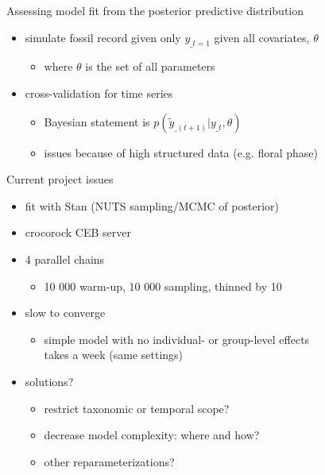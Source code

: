 \documentclass{beamer}
\begin{document}
\begin{frame}
  \begin{block}{Assessing model fit from the posterior predictive distribution}
    \begin{itemize}
      \item simulate fossil record given only \(y_{\_t = 1}\) given all covariates, \(\theta\)
        \begin{itemize}
          \item where \(\theta\) is the set of all parameters
        \end{itemize}
      \item cross-validation for time series
        \begin{itemize}
          \item Bayesian statement is \(p(\tilde{y}_{\_(t + 1)} | y_{\_t}, \theta)\)
          \item issues because of high structured data (e.g. floral phase)
        \end{itemize}
    \end{itemize}
  \end{block}
\end{frame}

\begin{frame}
  \begin{alertblock}{Current project issues}
    \begin{itemize}
      \item fit with Stan (NUTS sampling/MCMC of posterior)
      \item crocorock CEB server
      \item 4 parallel chains
        \begin{itemize}
          \item 10 000 warm-up, 10 000 sampling, thinned by 10
        \end{itemize}
      \item slow to converge 
        \begin{itemize}
          \item simple model with no individual- or group-level effects \\takes a week (same settings)
        \end{itemize}
      \item solutions?
        \begin{itemize}
          \item restrict taxonomic or temporal scope?
          \item decrease model complexity: where and how?
          \item other reparameterizations?
        \end{itemize}
    \end{itemize}
  \end{alertblock}
\end{frame}
\end{document}
